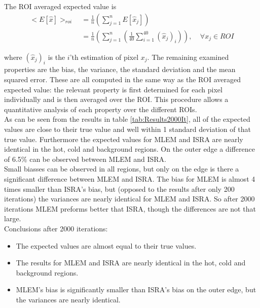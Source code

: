 \documentclass[report,12pt]{report}
\begin{document}
The ROI averaged expected value is
\begin{align}
	<E[\hat x]>_{roi}\ 
	&= \frac{1}{n} \left( \sum_{j=1}^{n} E[\hat x_j]\right)
	\nonumber\\
	&= \frac{1}{n} \left( \sum_{j=1}^{n} \left( \frac{1}{40}\sum_{i=1}^{40}(\hat x_j)_i \right)\right),\ \ \ \ \ \forall x_j \in ROI
\end{align}

where $(\hat x_j)_i$ is the $i$'th estimation of pixel $x_j$. The remaining examined properties are the bias, the variance, the standard deviation and the mean squared error. These are all computed in the same way as the ROI averaged expected value: the relevant property is first determined for each pixel individually and is then averaged over the ROI. This procedure allows a quantitative analysis of each property over the different ROIs.\\



As can be seen from the results in table \ref{tab:Results2000It}, all of the expected values are close to their true value and well within 1 standard deviation of that true value. Furthermore the expected values for MLEM and ISRA are nearly identical in the hot, cold and background regions. On the outer edge a difference of 6.5\% can be observed between MLEM and ISRA.\\

Small biasses can be observed in all regions, but only on the edge is there a significant difference between MLEM and ISRA. The bias for MLEM is almost 4 times smaller than ISRA's bias, but (opposed to the results after only 200 iterations) the variances are nearly identical for MLEM and ISRA. So after 2000 iterations MLEM preforms better that ISRA, though the differences are not that large.\\

Conclusions after 2000 iterations:
\begin{itemize}
	\item The expected values are almost equal to their true values.
	
	\item The results for MLEM and ISRA are nearly identical in the hot, cold and background regions.
	
	\item MLEM's bias is significantly smaller than ISRA's bias on the outer edge, but the variances are nearly identical.
\end{itemize}
\end{document}
